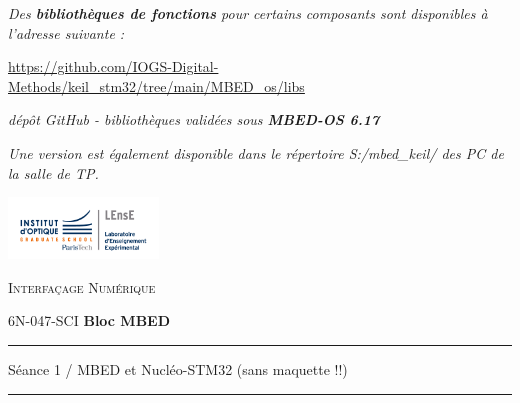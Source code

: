 \documentclass[a4paper,11pt,titlepage]{article} %
\begin{document}
\begin{titlepage}
\begin{center}
\textit{\large Des \textbf{bibliothèques de fonctions} pour certains composants sont disponibles à l'adresse suivante :}

\medskip

\href{https://github.com/IOGS-Digital-Methods/keil_stm32/tree/main/MBED_os/libs}{\large https://github.com/IOGS-Digital-Methods/keil\_stm32/tree/main/MBED\_os/libs}

\medskip

\textit{dépôt GitHub - bibliothèques validées sous \textbf{MBED-OS 6.17}}

\textit{Une version est également disponible dans le répertoire S:/mbed\_keil/ des PC de la salle de TP.}


\end{center}
\end{titlepage}


\newpage
\strut %
\newpage
\strut %

\begin{minipage}[c]{.25\linewidth}
	\includegraphics[width=4cm]{images/Logo-LEnsE.png}
\end{minipage} \hfill
\begin{minipage}[c]{.4\linewidth}

\begin{center}
\vspace{0.3cm}
{\Large \textsc{Interfaçage Numérique}}

\medskip

6N-047-SCI \qquad \textbf{\Large Bloc MBED}

\end{center}
\end{minipage}\hfill

\vspace{0.5cm}

\noindent \rule{\linewidth}{1pt}

{\noindent\Large \rule[-7pt]{0pt}{30pt} Séance 1 / MBED et Nucléo-STM32 (sans maquette !!)} 

\noindent \rule{\linewidth}{1pt}


\end{document}
